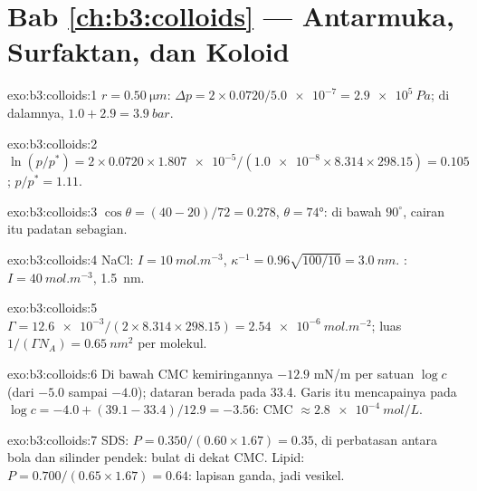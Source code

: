 \section*{Bab \ref{ch:b3:colloids} --- Antarmuka, Surfaktan, dan Koloid}

\begin{solution}{exo:b3:colloids:1}
$r = \qty{0.50}{\micro m}$: $\Delta p = 2 \times 0.0720/\num{5.0e-7} = \qty{2.9e5}{Pa}$; di dalamnya, $1.0 + 2.9 = \qty{3.9}{bar}$.
\end{solution}

\begin{solution}{exo:b3:colloids:2}
$\ln(p/p^*) = 2 \times 0.0720 \times \num{1.807e-5}/(\num{1.0e-8} \times 8.314 \times 298.15) = 0.105$; $p/p^* = 1.11$.
\end{solution}

\begin{solution}{exo:b3:colloids:3}
$\cos\theta = (40 - 20)/72 = 0.278$, $\theta = \ang{74}$: di bawah $90^\circ$, cairan itu  padatan
sebagian.
\end{solution}

\begin{solution}{exo:b3:colloids:4}
NaCl: $I = \qty{10}{mol.m^{-3}}$, $\kappa^{-1} = 0.96\sqrt{100/10} = \qty{3.0}{nm}$. : $I = \qty{40}{mol.m^{-3}}$, \qty{1.5}{nm}.
\end{solution}

\begin{solution}{exo:b3:colloids:5}
$\Gamma = \num{12.6e-3}/(2 \times 8.314 \times 298.15) = \qty{2.54e-6}{mol.m^{-2}}$; luas $1/(\Gamma N_A) =
\qty{0.65}{nm^2}$ per molekul.
\end{solution}

\begin{solution}{exo:b3:colloids:6}
Di bawah CMC kemiringannya $-12.9$ \unit{mN/m} per satuan $\log c$ (dari $-5.0$ sampai $-4.0$);
dataran berada pada 33.4. Garis itu mencapainya pada $\log c = -4.0 + (39.1 - 33.4)/12.9 = -3.56$: CMC
$\approx \qty{2.8e-4}{mol/L}$.
\end{solution}

\begin{solution}{exo:b3:colloids:7}
SDS: $P = 0.350/(0.60 \times 1.67) = 0.35$, di perbatasan antara bola dan
silinder pendek:  bulat di dekat CMC. Lipid: $P = 0.700/(0.65 \times 1.67) = 0.64$:
lapisan ganda, jadi vesikel.
\end{solution}

